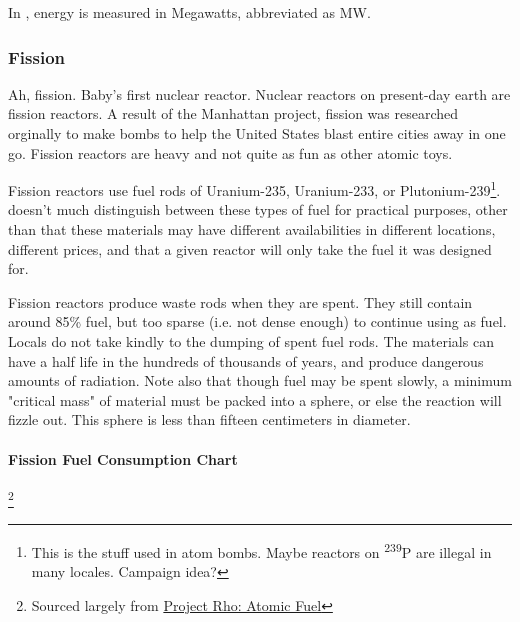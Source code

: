 \par
In \getTitle , energy is measured in Megawatts, abbreviated as MW.

\subsubsection{Fission}

\par
Ah, fission. Baby's first nuclear reactor. Nuclear reactors on present-day earth are fission reactors. A result of the Manhattan project, fission was researched orginally to make bombs to help the United States blast entire cities away in one go. Fission reactors are heavy and not quite as fun as other atomic toys.

\par
Fission reactors use fuel rods of Uranium-235, Uranium-233, or Plutonium-239\footnote{This is the stuff used in atom bombs. Maybe reactors on \textsuperscript{239}P are illegal in many locales. Campaign idea?}. \getTitle\, doesn't much distinguish between these types of fuel for practical purposes, other than that these materials may have different availabilities in different locations, different prices, and that a given reactor will only take the fuel it was designed for.

\par
Fission reactors produce waste rods when they are spent. They still contain around 85\% fuel, but too sparse (i.e. not dense enough) to continue using as fuel. Locals do not take kindly to the dumping of spent fuel rods. The materials can have a half life in the hundreds of thousands of years, and produce dangerous amounts of radiation. Note also that though fuel may be spent slowly, a minimum "critical mass" of material must be packed into a sphere, or else the reaction will fizzle out. This sphere is less than fifteen centimeters in diameter.

\paragraph{Fission Fuel Consumption Chart}\footnote{Sourced largely from \href{http://www.projectrho.com/public_html/rocket/atomicfuel.php}{Project Rho: Atomic Fuel}}
\paragraph{}

